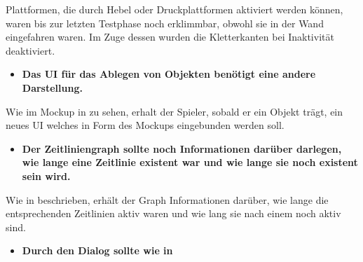 Plattformen, die durch Hebel oder Druckplattformen aktiviert werden können, waren bis zur letzten Testphase noch erklimmbar, obwohl sie in der Wand eingefahren waren. Im Zuge dessen wurden die Kletterkanten bei Inaktivität deaktiviert.

\begin{itemize}  
    \item \textbf{Das \ac{UI} für das Ablegen von Objekten benötigt eine andere Darstellung.}
\end{itemize}

Wie im Mockup in  zu sehen, erhalt der Spieler, sobald er ein Objekt trägt, ein neues \ac{UI} welches in Form des Mockups eingebunden werden soll.

\begin{itemize}  
    \item \textbf{Der Zeitliniengraph sollte noch Informationen darüber darlegen, wie lange eine Zeitlinie existent war und wie lange sie noch existent sein wird.}
\end{itemize}

Wie in  beschrieben, erhält der Graph Informationen darüber, wie lange die entsprechenden Zeitlinien aktiv waren und wie lang sie nach einem  noch aktiv sind.

\begin{itemize}
\item \textbf{Durch den Dialog sollte wie in }
\end{itemize}

